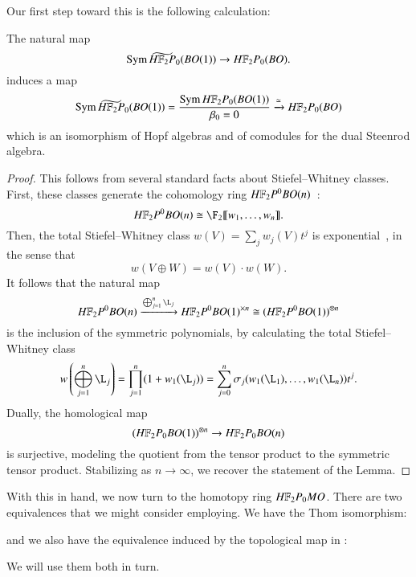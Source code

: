 Our first step toward this is the following calculation:
\begin{lemma}\label{HF2BOIsSymAlg}
The natural map \[\Sym \widetilde{\HFtwo P}_0(BO(1)) \to \HFtwo P_0(BO).\] induces a map \[\Sym \widetilde{\HFtwo P}_0(BO(1)) = \frac{\Sym \HFtwo P_0(BO(1))}{\beta_0 = 0} \xrightarrow{\simeq} \HFtwo P_0(BO)\] which is an isomorphism of Hopf algebras and of comodules for the dual Steenrod algebra.
\end{lemma}
\begin{proof}
This follows from several standard facts about Stiefel--Whitney classes.  First, these classes generate the cohomology ring $\HFtwo P^0 BO(n)$~\cite[Theorem 16.10]{Switzer}: \[\HFtwo P^0 BO(n) \cong \F_2\ps{w_1, \ldots, w_n}.\]  Then, the total Stiefel--Whitney class $w(V) = \sum_j w_j(V) t^j$ is exponential~\cite[Theorem 16.3]{Switzer}, in the sense that \[w(V \oplus W) = w(V) \cdot w(W).\]  It follows that the natural map \[\HFtwo P^0 BO(n) \xrightarrow{\bigoplus_{j=1}^n \L_j} \HFtwo P^0 BO(1)^{\times n} \cong (\HFtwo P^0 BO(1))^{\otimes n}\] is the inclusion of the symmetric polynomials, by calculating the total Stiefel--Whitney class \[w\left( \bigoplus_{j=1}^n \L_j \right) = \prod_{j=1}^n (1 + w_1(\L_j)) = \sum_{j=0}^n \sigma_j(w_1(\L_1), \ldots, w_1(\L_n)) t^j.\]  Dually, the homological map \[(\HFtwo P_0 BO(1))^{\otimes n} \to \HFtwo P_0 BO(n)\] is surjective, modeling the quotient from the tensor product to the symmetric tensor product.  Stabilizing as $n \to \infty$, we recover the statement of the Lemma.
\end{proof}

With this in hand, we now turn to the homotopy ring $\HFtwo P_0 MO$.  There are two equivalences that we might consider employing.  We have the Thom isomorphism:
\begin{center}
\end{center}
and we also have the equivalence induced by the topological map in :
\begin{center}
\end{center}
We will use them both in turn.

